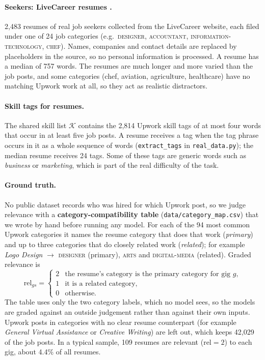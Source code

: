 \documentclass[12pt,a4paper]{article}
\numberwithin{equation}{section}
\theoremstyle{definition}
\theoremstyle{plain}
\newcommand{\rel}{\mathrm{rel}}
\newcommand{\DataGigsMapped}{42,029}
\newcommand{\DataMappedCats}{94}
\newcommand{\DataSeekers}{2,483}
\newcommand{\DataVocab}{2,814}
\newcommand{\DataSeekerTags}{24}
\newcommand{\DataResumeWords}{757}
\newcommand{\DataRelTwo}{109}
\newcommand{\DataRelTwoPct}{4.4\%}
\begin{document}
\paragraph{Seekers: LiveCareer resumes \citep{resumedata}.} \DataSeekers{} resumes of real job seekers collected from the LiveCareer website, each filed under one of 24 job categories (e.g.\ \textsc{designer}, \textsc{accountant}, \textsc{information-technology}, \textsc{chef}). Names, companies and contact details are replaced by placeholders in the source, so no personal information is processed. A resume has a median of \DataResumeWords{} words. The resumes are much longer and more varied than the job posts, and some categories (chef, aviation, agriculture, healthcare) have no matching Upwork work at all, so they act as realistic distractors.

\paragraph{Skill tags for resumes.} The shared skill list $\mathcal{K}$ contains the \DataVocab{} Upwork skill tags of at most four words that occur in at least five job posts. A resume receives a tag when the tag phrase occurs in it as a whole sequence of words (\texttt{extract\_tags} in \texttt{real\_data.py}); the median resume receives \DataSeekerTags{} tags. Some of these tags are generic words such as \emph{business} or \emph{marketing}, which is part of the real difficulty of the task.

\paragraph{Ground truth.} No public dataset records who was hired for which Upwork post, so we judge relevance with a \textbf{category-compatibility table} (\texttt{data/category\_map.csv}) that we wrote by hand before running any model. For each of the \DataMappedCats{} most common Upwork categories it names the resume category that does that work (\emph{primary}) and up to three categories that do closely related work (\emph{related}); for example \emph{Logo Design} $\to$ \textsc{designer} (primary), \textsc{arts} and \textsc{digital-media} (related). Graded relevance is
\begin{equation}
\rel_{gs} = \begin{cases}2 & \text{the resume's category is the primary category for gig } g,\\ 1 & \text{it is a related category},\\ 0 & \text{otherwise.}\end{cases}
\label{eq:gt}
\end{equation}
The table uses only the two category labels, which no model sees, so the models are graded against an outside judgement rather than against their own inputs. Upwork posts in categories with no clear resume counterpart (for example \emph{General Virtual Assistance} or \emph{Creative Writing}) are left out, which keeps \DataGigsMapped{} of the job posts. In a typical sample, \DataRelTwo{} resumes are relevant ($\rel=2$) to each gig, about \DataRelTwoPct{} of all resumes.
\end{document}
